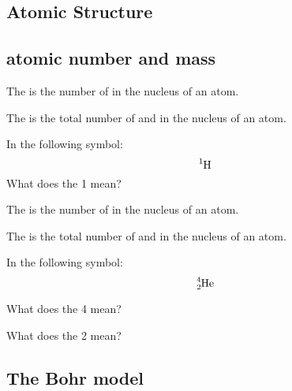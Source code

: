 \documentclass[12pt]{exam}
\begin{document}
\twocolumn
{}
    \begin{questions}
        

    \section{Atomic Structure}

    \subsection{atomic number and mass}

    \question The  is the number of \fillin[protons][3cm] in the nucleus of an atom.

    \question The  is the total number of \fillin[protons][3cm] and \fillin[neutrons][3cm]in the nucleus of an atom.



\question In the following symbol:
$$\ce{^{1}_{}H}$$
What does the 1 mean?

\fillwithlines{2cm}


\question The  is the number of \fillin[protons]in the nucleus of an atom.

\question The   is the total number of \fillin[protons] and \fillin[neutrons] in the nucleus of an atom.

\question In the following symbol:
           $$\ce{^{4}_{2}He}$$

\question What does the 4 mean? 

\fillwithlines{1cm}

\question What does the 2 mean?
\fillwithlines{1cm}

\subsection{The Bohr model}

\end{questions}
\end{document}
